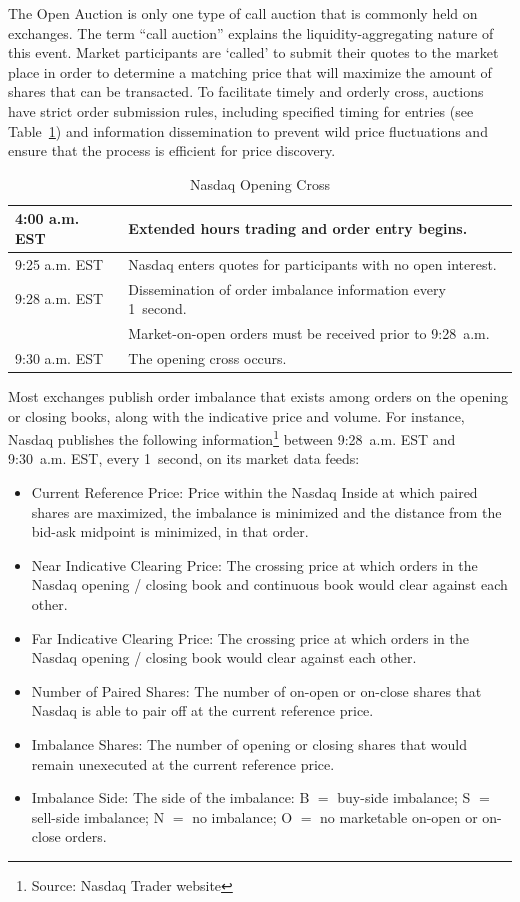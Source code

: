The Open Auction is only one type of call auction that is commonly held on exchanges. The term ``call auction'' explains the liquidity-aggregating nature of this event. Market participants are `called' to submit their quotes to the market place in order to determine a matching price that will maximize the amount of shares that can be transacted. To facilitate timely and orderly cross, auctions have strict order submission rules, including specified timing for entries (see Table~\ref{tab:NASDAQopen}) and information dissemination to prevent wild price fluctuations and ensure that the process is efficient for price discovery.
        \begin{table}[!ht]
        \centering
        \caption{Nasdaq Opening Cross\label{tab:NASDAQopen}}
        \begin{tabular}{ll} 
        	4:00 a.m. EST & Extended hours trading and order entry begins.  \\ \hline
        	9:25 a.m. EST & Nasdaq enters quotes for participants with no open interest. \\ \hline
        	9:28 a.m. EST & Dissemination of order imbalance information every 1~second.  \\ 
        	 & Market-on-open orders must be received prior to 9:28~a.m.   \\ \hline	
        	9:30 a.m. EST & The opening cross occurs.		
        \end{tabular}
        \end{table}	


Most exchanges publish order imbalance that exists among orders on the opening or closing books, along with the indicative price and volume. For instance, Nasdaq publishes the following information\footnote{Source: Nasdaq Trader website} between 9:28~a.m. EST and 9:30~a.m. EST,  every 1~second, on its market data feeds: 
        \begin{itemize}
        \item  Current Reference Price: Price within the Nasdaq Inside at which paired shares are maximized, the imbalance is minimized and the distance from the bid-ask midpoint is minimized, in that order. 
        \item  Near Indicative Clearing Price: The crossing price at which orders in the Nasdaq opening / closing book and continuous book would clear against each other. 
        \item  Far Indicative Clearing Price: The crossing price at which orders in the Nasdaq opening / closing book would clear against each other. 
        \item  Number of Paired Shares: The number of on-open or on-close shares that Nasdaq is able to pair off at the current reference price. 
        \item  Imbalance Shares: The number of opening or closing shares that would remain unexecuted at the current reference price. 
        \item  Imbalance Side: The side of the imbalance: B $=$ buy-side imbalance; S $=$ sell-side imbalance; N $=$ no imbalance; O $=$ no marketable on-open or on-close orders. 
        \end{itemize}


